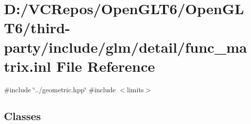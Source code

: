 \hypertarget{func__matrix_8inl}{}\section{D\+:/\+V\+C\+Repos/\+Open\+G\+L\+T6/\+Open\+G\+L\+T6/third-\/party/include/glm/detail/func\+\_\+matrix.inl File Reference}
\label{func__matrix_8inl}
{\ttfamily \#include \char`\"{}../geometric.\+hpp\char`\"{}}\newline
{\ttfamily \#include $<$limits$>$}\newline
\subsection*{Classes}
